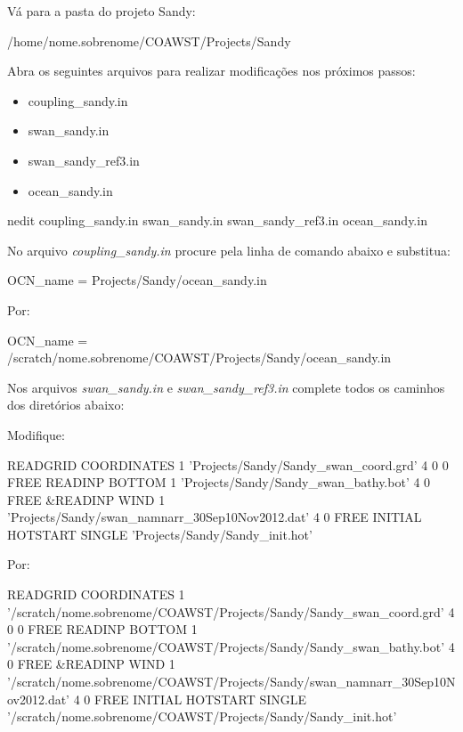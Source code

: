 \noindent Vá para a pasta do projeto Sandy:
\bigskip

\begin{bashcode}
/home/nome.sobrenome/COAWST/Projects/Sandy
\end{bashcode}
\bigskip

\noindent Abra os seguintes arquivos para realizar modificações nos próximos passos:
\bigskip

\begin{itemize}
\item coupling\_sandy.in
\item swan\_sandy.in
\item swan\_sandy\_ref3.in
\item ocean\_sandy.in
\end{itemize}
\bigskip

\begin{bashcode}
nedit coupling_sandy.in swan_sandy.in swan_sandy_ref3.in ocean_sandy.in
\end{bashcode}
\bigskip

\noindent No arquivo \textit{coupling\_sandy.in} procure pela linha de comando abaixo e substitua:
\bigskip

\begin{bashcode}
OCN_name = Projects/Sandy/ocean_sandy.in
\end{bashcode}
\bigskip

\noindent Por:
\bigskip

\begin{bashcode}
OCN_name = /scratch/nome.sobrenome/COAWST/Projects/Sandy/ocean_sandy.in
\end{bashcode}
\bigskip

\noindent Nos arquivos \textit{swan\_sandy.in} e \textit{swan\_sandy\_ref3.in} complete todos os caminhos dos diretórios abaixo:
\bigskip

\noindent Modifique:
\bigskip

\begin{bashcode}
READGRID COORDINATES 1 'Projects/Sandy/Sandy_swan_coord.grd' 4 0 0 FREE
READINP BOTTOM 1 'Projects/Sandy/Sandy_swan_bathy.bot' 4 0 FREE
&READINP WIND 1 'Projects/Sandy/swan_namnarr_30Sep10Nov2012.dat' 4 0 FREE
INITIAL HOTSTART SINGLE 'Projects/Sandy/Sandy_init.hot'
\end{bashcode}
\bigskip

\noindent Por:
\bigskip

\begin{bashcode}[fontsize=\scriptsize]
READGRID COORDINATES 1 '/scratch/nome.sobrenome/COAWST/Projects/Sandy/Sandy_swan_coord.grd' 4 0 0 FREE
READINP BOTTOM 1 '/scratch/nome.sobrenome/COAWST/Projects/Sandy/Sandy_swan_bathy.bot' 4 0 FREE
&READINP WIND 1 '/scratch/nome.sobrenome/COAWST/Projects/Sandy/swan_namnarr_30Sep10Nov2012.dat' 4 0 FREE
INITIAL HOTSTART SINGLE '/scratch/nome.sobrenome/COAWST/Projects/Sandy/Sandy_init.hot'
\end{bashcode}
\bigskip

